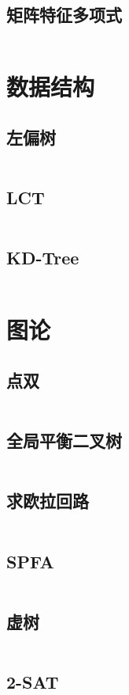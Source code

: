 \documentclass[a4paper,9]{article}
\begin{document}
\subsection{矩阵特征多项式}
\inputminted[breaklines]{c++}{linear_algebra/charac-poly.cpp}

\section{数据结构}
\subsection{左偏树}
\inputminted[breaklines]{c++}{data_structure/leftist_tree.cpp}
\subsection{LCT}
\inputminted[breaklines]{c++}{data_structure/lct.cpp}
\subsection{KD-Tree}
\inputminted[breaklines]{c++}{data_structure/kd_tree.cpp}

\section{图论}
\subsection{点双}
\inputminted[breaklines]{c++}{graph/bcc.cpp}
\subsection{全局平衡二叉树}
\inputminted[breaklines]{c++}{graph/全局平衡二叉树.cpp}
\subsection{求欧拉回路}
\inputminted[breaklines]{c++}{graph/euler_tour.cpp}
\subsection{SPFA}
\inputminted[breaklines]{c++}{graph/spfa.cpp}
\subsection{虚树}
\inputminted[breaklines]{c++}{graph/xushu.cpp}
\subsection{2-SAT}
\inputminted[breaklines]{c++}{graph/2_sat.cpp}
\end{document}
